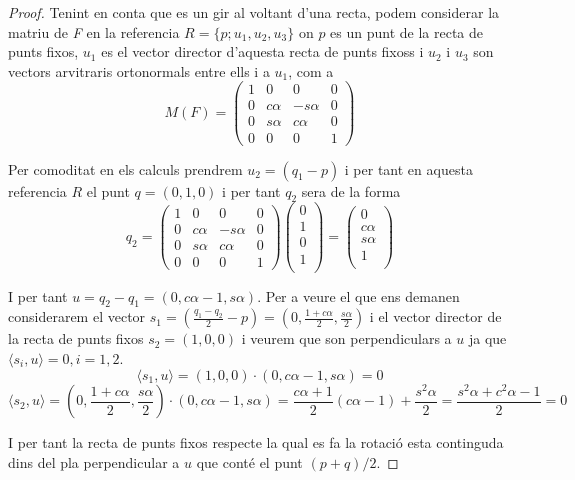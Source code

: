 \documentclass[12pt, a4papre]{article}
\begin{document}
	\begin{proof}
	
		 Tenint en conta que es un gir al voltant d'una recta, podem considerar la matriu de \textit{F} en la referencia $R=\{p; u_1, u_2, u_3\}$ on 
		$p$ es un punt de la recta de punts fixos, $u_1$ es el vector director d'aquesta recta de punts fixoss i $u_2$ i $u_3$ son vectors 
		arvitraris ortonormals entre ells i a $u_1$, com a
		\[
		M(F)= 
		\begin{pmatrix}
			1	&	0	&	0	&	0\\
			0	&	c\alpha &	- s\alpha	& 0\\
			0	&	s\alpha  & c\alpha	& 0\\
			0	&	0    & 	0	& 1 
		\end{pmatrix}
		\]
		
		Per comoditat en els calculs prendrem $u_2=(q_1-p)$ i per tant en aquesta referencia $R$ el punt $q=(0, 1, 0)$ i per tant $q_2$ sera de la forma
		\[
		q_2=
		\begin{pmatrix}
			1	&	0	&	0	&	0\\
			0	&	c\alpha &	- s\alpha	& 0\\
			0	&	s\alpha  & c\alpha	& 0\\
			0	&	0    & 	0	& 1 
		\end{pmatrix}
		\begin{pmatrix}
			0\\
			1\\
			0 \\
			1 \\
		\end{pmatrix}
		=
		\begin{pmatrix}
			0\\
			c\alpha\\
			s\alpha \\
			1 \\
		\end{pmatrix}
		\]
		
		I per tant $u=q_2-q_1=(0, c\alpha-1,s\alpha)$. Per a veure el que ens demanen considerarem el vector $s_1=(\frac{q_1-q_2}{2}-p)=(0, \frac{1+c\alpha}{2},\frac{s\alpha}{2})$ 
		i el vector director de la recta de punts fixos $s_2=(1,0,0)$ i veurem que son perpendiculars a $u$ ja que $\langle s_i, u\rangle = 0, i=1,2$.
		\[
		\langle s_1, u\rangle =(1,0,0)\cdot(0, c\alpha-1,s\alpha)=0
		\]
		\[
		\langle s_2, u\rangle = (0, \frac{1+c\alpha}{2},\frac{s\alpha}{2})\cdot(0, c\alpha-1,s\alpha)=
		\frac{c\alpha+1}{2}(c\alpha-1)+\frac{s^2\alpha}{2}=\frac{s^2\alpha+c^2\alpha-1}{2}=0
		\]
		
		I per tant la recta de punts fixos respecte la qual es fa la rotació esta continguda dins del pla perpendicular a $u$ que conté el punt $(p+q)/2$.
		
	\end{proof}
	\newpage
	
\end{document}
